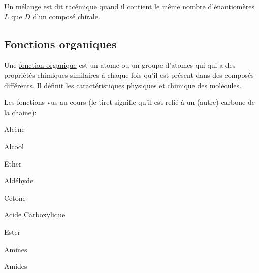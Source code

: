 \documentclass[a4paper]{article}
\begin{document}
        Un mélange est dit \underline{racémique} quand il contient le même
        nombre d'énantiomères $L$ que $D$ d'un composé chirale.

    \subsection{Fonctions organiques} \label{ss:fct}

    Une \underline{fonction organique} est un atome ou un groupe d'atomes qui
    qui a des propriétés chimiques similaires à chaque fois qu'il est présent
    dans des composés différents. Il définit les caractéristiques physiques
    et chimique des molécules.
    
    Les fonctions vus au cours (le tiret signifie qu'il est relié à un (autre) 
    carbone de la chaine):


    Alcène \hspace{0.1\linewidth} \newline

    Alcool \hspace{0.1\linewidth} \newline

    Ether \hspace{0.1\linewidth} \newline

    Aldéhyde \hspace{0.1\linewidth} \newline

    Cétone \hspace{0.1\linewidth} \newline

    Acide Carboxylique \hspace{0.1\linewidth} \newline

    Ester \hspace{0.1\linewidth} \newline

    Amines \hspace{0.1\linewidth} \newline

    Amides \hspace{0.1\linewidth} \newline
\end{document}
